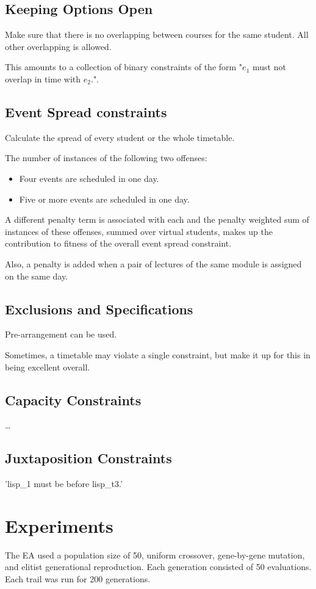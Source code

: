 \documentclass[12pt]{book}
\begin{document}
\subsection{Keeping Options Open}
Make sure that there is no overlapping between courses for the same student. All other overlapping is allowed.

This amounts to a collection of binary constraints of the form "$e_1$ must not overlap in time with $e_2$.".

\subsection{Event Spread constraints}
Calculate the spread of every student or the whole timetable.

The number of instances of the following two offenses:
\begin{itemize}
\item Four events are scheduled in one day.
\item Five or more events are scheduled in one day.
\end{itemize}
A different penalty term is associated with each and the penalty weighted sum of instances of these offenses, summed over virtual students, makes up the contribution to fitness of the overall event spread constraint.

Also, a penalty is added when a pair of lectures of the same module is assigned on the same day.

\subsection{Exclusions and Specifications}
Pre-arrangement can be used.

Sometimes, a timetable may violate a single constraint, but make it up for this in being excellent overall.

\subsection{Capacity Constraints}
\dots

\subsection{Juxtaposition Constraints}
'lisp\_1 must be before lisp\_t3.'

\section{Experiments}
The EA used a population size of 50, uniform crossover, gene-by-gene mutation, and elitist generational reproduction. Each generation consisted of 50 evaluations. Each trail was run for 200 generations.
\end{document}
